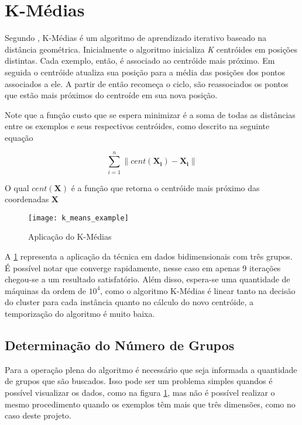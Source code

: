 \section{K-Médias}

Segundo \citet{witten2011data}, K-Médias é um algoritmo de aprendizado iterativo baseado na distância geométrica. Inicialmente o algoritmo inicializa \textit{K} centróides em posições distintas. Cada exemplo, então, é associado ao centróide mais próximo. Em seguida o centróide atualiza sua posição para a média das posições dos pontos associados a ele. A partir de então recomeça o ciclo, são reassociados os pontos que estão mais próximos do centroíde em sua nova posição.

Note que a função custo que se espera minimizar é a soma de todas as distâncias entre os exemplos e seus respectivos centróides, como descrito na seguinte equação

\[
\sum_{i=1}^{n} \lVert cent(\mathbf{X_{i}}) - \mathbf{X_{i}} \rVert
\]

O qual \(cent(\mathbf{X})\) é a função que retorna o centróide mais próximo das coordenadas \(\mathbf{X}\)

\begin{figure}
\texttt{[image: k\_means\_example]}
\caption[Aplicação do K-Médias]{Aplicação do K-Médias} \label{fig:k_means_example}
\end{figure}

A \ref{fig:k_means_example} representa a aplicação da técnica em dados bidimensionais com três grupos. É possível notar que converge rapidamente, nesse caso em apenas 9 iterações chegou-se a um resultado satisfatório. Além disso, espera-se uma quantidade de máquinas da ordem de \(10^4\), como o algoritmo K-Médias é linear tanto na decisão do cluster para cada instância quanto no cálculo do novo centróide, a temporização do algoritmo é muito baixa.

\subsection{Determinação do Número de Grupos}

Para a operação plena do algoritmo é necessário que seja informada a quantidade de grupos que são buscados. Isso pode ser um problema simples quandos é possível visualizar os dados, como na figura \ref{fig:k_means_example}, mas não é possível realizar o mesmo procedimento quando os exemplos têm mais que três dimensões, como no caso deste projeto.


